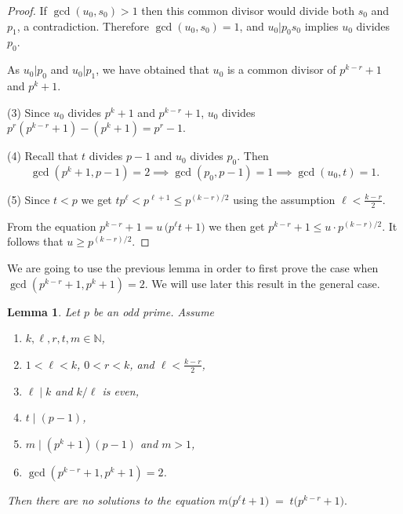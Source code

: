 \documentclass[oneside,a4paper,12pt]{article}
\theoremstyle{plain} %
\newtheorem{lemma}[theorem]{Lemma}
\theoremstyle{definition} %
\begin{document}
\begin{proof}
If $\gcd(u_0,s_0)>1$ then this common divisor would divide 
both $s_0$ and $p_1$, a contradiction.
Therefore $\gcd(u_0,s_0)=1$, and $u_0 | p_0 s_0$ implies $u_0$ divides $p_0$.

As $u_0|p_0$ and $u_0|p_1$, we have obtained that $u_0$ is a common divisor of $p^{k-r}+1$ and $p^k+1$.  

(3) \quad  Since $u_0$ divides $p^k+1$ and $p^{k-r}+1$,
$u_0$ divides $p^r(p^{k-r}+1)-(p^k+1)=p^r-1$.

(4) \quad Recall that $t$ divides $p-1$ and $u_0$ divides $p_0$.
Then
\[
\gcd(p^k+1,p-1)=2 
\implies \gcd(p_0,p-1)=1 
\implies \gcd(u_0,t)=1.
\]


(5) \quad Since $t<p$ we get $tp^\ell < p^{\ell +1} \le p^{(k-r)/2}$
using the assumption $\ell < \frac{k-r}{2}$.

From the equation $p^{k-r}+1 = u\,\bigl(p^\ell t+1\bigr)$
we then get $p^{k-r}+1 \le u \cdot p^{(k-r)/2}$.
It follows that $u \ge p^{(k-r)/2}$.
\end{proof}











We are going to use the previous lemma in order to first prove the case when $\gcd(p^{k-r}+1,p^k+1)=2$. We will use later this result in the general case.


\begin{lemma}\label{general_div2}
Let $p$ be an odd prime. Assume
\begin{enumerate}
  \item $k,\ell,r,t,m\in\mathbb{N}$, 
  \item $1<\ell < k$,  $0<r<k$, and $\ell < \frac{k-r}{2}$, 
  \item $\ell\mid k$ and $k/\ell$ is even,
  \item $t\mid (p-1)$,
  \item $m\mid (p^k+1)(p-1)$ and $m>1$,
  \item $\gcd(p^{k-r}+1,p^k+1)=2$.
\end{enumerate}
 Then there are no solutions
to the equation
$m\bigl(p^\ell t+1\bigr) \;=\; t\bigl(p^{k-r}+1\bigr).$
\end{lemma}
\end{document}

